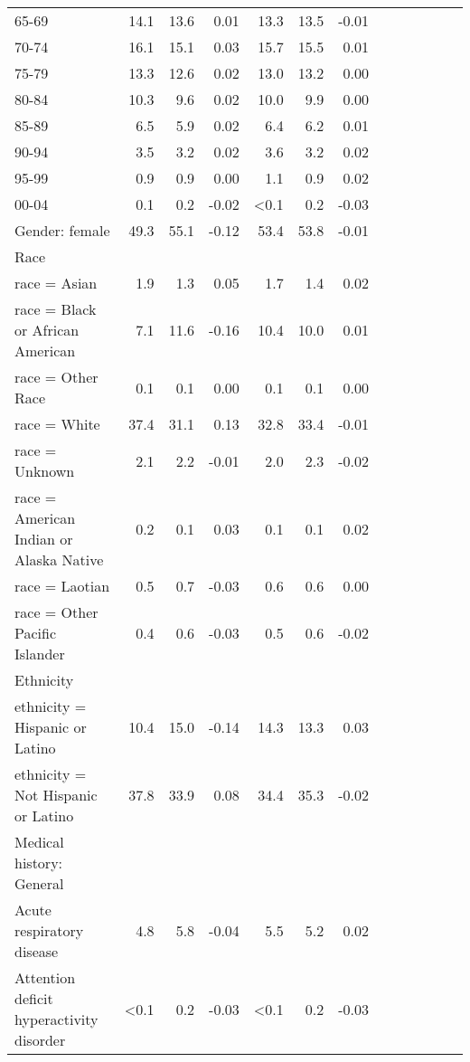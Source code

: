 \documentclass[11pt,]{article}
\begin{document}
\begin{longtable}{lrrrrrrrrrrrr}
      65-69 & 14.1 & 13.6 &  0.01 & 13.3 & 13.5 & -0.01 \\ 
      70-74 & 16.1 & 15.1 &  0.03 & 15.7 & 15.5 &  0.01 \\ 
      75-79 & 13.3 & 12.6 &  0.02 & 13.0 & 13.2 &  0.00 \\ 
      80-84 & 10.3 &  9.6 &  0.02 & 10.0 &  9.9 &  0.00 \\ 
      85-89 &  6.5 &  5.9 &  0.02 &  6.4 &  6.2 &  0.01 \\ 
      90-94 &  3.5 &  3.2 &  0.02 &  3.6 &  3.2 &  0.02 \\ 
      95-99 &  0.9 &  0.9 &  0.00 &  1.1 &  0.9 &  0.02 \\ 
      00-04 &  0.1 &  0.2 & -0.02 & <0.1 &  0.2 & -0.03 \\ 
  Gender: female & 49.3 & 55.1 & -0.12 & 53.4 & 53.8 & -0.01 \\ 
  Race &    &    &     &    &    &     \\ 
      race = Asian &  1.9 &  1.3 &  0.05 &  1.7 &  1.4 &  0.02 \\ 
      race = Black or African American &  7.1 & 11.6 & -0.16 & 10.4 & 10.0 &  0.01 \\ 
      race = Other Race &  0.1 &  0.1 &  0.00 &  0.1 &  0.1 &  0.00 \\ 
      race = White & 37.4 & 31.1 &  0.13 & 32.8 & 33.4 & -0.01 \\ 
      race = Unknown &  2.1 &  2.2 & -0.01 &  2.0 &  2.3 & -0.02 \\ 
      race = American Indian or Alaska Native &  0.2 &  0.1 &  0.03 &  0.1 &  0.1 &  0.02 \\ 
      race = Laotian &  0.5 &  0.7 & -0.03 &  0.6 &  0.6 &  0.00 \\ 
      race = Other Pacific Islander &  0.4 &  0.6 & -0.03 &  0.5 &  0.6 & -0.02 \\ 
  Ethnicity &    &    &     &    &    &     \\ 
      ethnicity = Hispanic or Latino & 10.4 & 15.0 & -0.14 & 14.3 & 13.3 &  0.03 \\ 
      ethnicity = Not Hispanic or Latino & 37.8 & 33.9 &  0.08 & 34.4 & 35.3 & -0.02 \\ 
  Medical history: General &    &    &     &    &    &     \\ 
      Acute respiratory disease &  4.8 &  5.8 & -0.04 &  5.5 &  5.2 &  0.02 \\ 
      Attention deficit hyperactivity disorder & <0.1 &  0.2 & -0.03 & <0.1 &  0.2 & -0.03 \\ 

\end{longtable}
\end{document}
